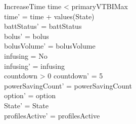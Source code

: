 \begin{schema}{IncreaseTime}
	time < primaryVTBIMax\\
	time' = time + values(State)\\
	battStatus' = battStatus\\
	bolus' = bolus\\
	bolusVolume' = bolusVolume\\
	infusing = No\\
	infusing' = infusing\\
	countdown > 0 \land countdown' = 5\\
	powerSavingCount' = powerSavingCount\\ 
	option' = option\\
State' = State\\
profilesActive' = profilesActive\\  
	 
\end{schema}

